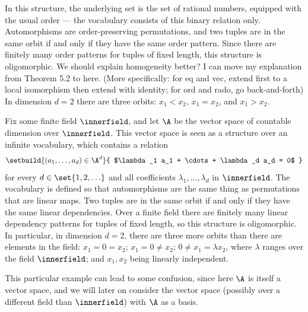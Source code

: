 \begin{myexample} \label{ex:order-atoms} In this structure, the underlying set is the set of rational numbers, equipped with the usual order --- 
the vocabulary consists of this binary relation only.
Automorphisms are order-preserving permutations, and two tuples are in the same orbit if and only if they have the same order pattern. Since there are finitely many order patterns for tuples of fixed length, this structure is oligomorphic. 
\color{magenta}We should explain homogeneity better? I can move my explanation from Theorem 5.2 to here. (More specifically: for eq and vec, extend first to a local isomorphism then extend with identity; for ord and rado, go back-and-forth)\color{black}
In dimension $d = 2$ there are three orbits: 
$x_1 < x_2$, $x_1 = x_2$, and $x_1 > x_2$.
\end{myexample}

\begin{myexample}
     \label{ex:vector-space-atoms} Fix some finite field $\innerfield$, and let $\A$ be the vector space of countable dimension over $\innerfield$. This vector space is seen as a structure over an infinite vocabulary, which contains a relation 
    \begin{align*}
    \setbuild{(a_1,\ldots,a_d) \in \A^d}{ $\lambda_1 a_1 + \cdots + \lambda_d a_d = 0$ }
    \end{align*}
    for every $d \in \set{1,2,\ldots}$ and all coefficients $\lambda_1, \ldots, \lambda_d$ in $\innerfield$. The vocabulary is defined so that automorphisms are the same thing as permutations that are linear maps. Two tuples are in the same orbit if and only if they have the same linear dependencies. Over a finite field there are finitely many linear dependency patterns for tuples of fixed length, so this structure is oligomorphic.
    In particular, in dimension $d = 2$, there are three more orbits than there are elements in the field: 
    $x_1 = 0 = x_2$;
    $x_1 = 0 \neq x_2$;
    $0 \neq x_1 = \lambda x_2$, where $\lambda$ ranges over the field $\innerfield$;
    and $x_1, x_2$ being linearly independent. 
    
    This particular example can lead to some confusion, since here $\A$ is itself a vector space, and we will later on consider the vector space (possibly over a different field than $\innerfield$) with $\A$ as a basis. %
\end{myexample}

